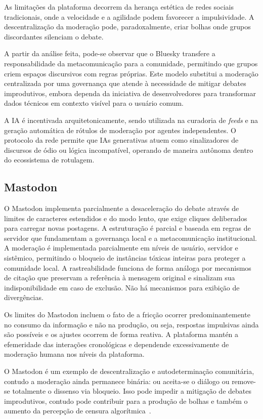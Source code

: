 \documentclass[conference]{IEEEtran} \IEEEoverridecommandlockouts %
\begin{document}
As limitações da plataforma decorrem da herança estética de redes sociais tradicionais, onde a velocidade e a agilidade podem favorecer a impulsividade. A descentralização da moderação pode, paradoxalmente, criar bolhas onde grupos discordantes silenciam o debate.

A partir da análise feita, pode-se observar que o Bluesky transfere a responsabilidade da metacomunicação para a comunidade, permitindo que grupos criem espaços discursivos com regras próprias. Este modelo substitui a moderação centralizada por uma governança que atende à necessidade de mitigar debates improdutivos, embora dependa da iniciativa de desenvolvedores para transformar dados técnicos em contexto visível para o usuário comum.

A IA é incentivada arquitetonicamente, sendo utilizada na curadoria de \textit{feeds} e na geração automática de rótulos de moderação por agentes independentes. O protocolo da rede permite que IAs generativas atuem como sinalizadores de discursos de ódio ou lógica incompatível, operando de maneira autônoma dentro do ecossistema de rotulagem.

\subsection{Mastodon}

O Mastodon implementa parcialmente a desaceleração do debate através de limites de caracteres estendidos e do modo lento, que exige cliques deliberados para carregar novas postagens. A estruturação é parcial e baseada em regras de servidor que fundamentam a governança local e a metacomunicação institucional. A moderação é implementada parcialmente em níveis de usuário, servidor e sistêmico, permitindo o bloqueio de instâncias tóxicas inteiras para proteger a comunidade local. A rastreabilidade funciona de forma análoga por mecanismos de citação que preservam a referência à mensagem original e sinalizam sua indisponibilidade em caso de exclusão. Não há mecanismos para exibição de divergências.

Os limites do Mastodon incluem o fato de a fricção ocorrer predominantemente no consumo da informação e não na produção, ou seja, respostas impulsivas ainda são possíveis e os ajustes ocorrem de forma reativa. A plataforma mantén a efemeridade das interações cronológicas e dependende excessivamente de moderação humana nos níveis da plataforma.

O Mastodon é um exemplo de descentralização e autodeterminação comunitária, contudo a moderação ainda permanece binária: ou aceita-se o diálogo ou remove-se totalmente o dissenso via bloqueio. Isso pode impedir a mitigação de debates improdutivos, contudo pode contribuir para a produção de bolhas e também o aumento da percepção de censura algorítmica~\cite{brandiLLMMediatedNudgeBasedText}.
\end{document}
